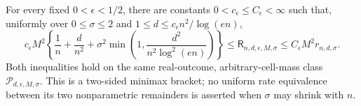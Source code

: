 For every fixed \(0<\epsilon<1/2\), there are constants \(0<c_{\epsilon}\le C_{\epsilon}<\infty\) such that, uniformly over \(0\le\sigma\le2\) and \(1\le d\le c_{\epsilon}n^2/\log(en)\),
\[
 c_{\epsilon}M^2\left\{\frac1n+\frac d{n^2}+\sigma^2\min\left(1,\frac{d^2}{n^2\log^2(en)}\right)\right\}
 \le\mathsf R_{n,d,\epsilon,M,\sigma}
 \le C_{\epsilon}M^2r_{n,d,\sigma}.
\]
Both inequalities hold on the same real-outcome, arbitrary-cell-mass class \(\mathcal P_{d,\epsilon,M,\sigma}\).  This is a two-sided minimax bracket; no uniform rate equivalence between its two nonparametric remainders is asserted when \(\sigma\) may shrink with \(n\).